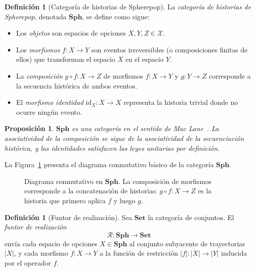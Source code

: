 \documentclass[12pt]{article}
\theoremstyle{plain}
\newtheorem{proposition}[theorem]{Proposición}
\theoremstyle{definition}
\newtheorem{definition}[theorem]{Definición}
\begin{document}
\begin{definition}[Categoría de historias de Spherepop]
\label{def:categoria}
La \emph{categoría de historias de Spherepop}, denotada $\mathbf{Sph}$, se define como sigue:
\begin{itemize}
\item[] Los \emph{objetos} son espacios de opciones $X, Y, Z \in \mathcal{X}$.
\item[] Los \emph{morfismos} $f: X \to Y$ son eventos irreversibles (o composiciones finitas de ellos) que transforman el espacio $X$ en el espacio $Y$.
\item[] La \emph{composición} $g \circ f: X \to Z$ de morfismos $f: X \to Y$ y $g: Y \to Z$ corresponde a la secuencia histórica de ambos eventos.
\item[] El \emph{morfismo identidad} $\mathrm{id}_X: X \to X$ representa la historia trivial donde no ocurre ningún evento.
\end{itemize}
\end{definition}

\begin{proposition}
\label{prop:categoria}
$\mathbf{Sph}$ es una categoría en el sentido de Mac Lane~\cite{maclane}. La asociatividad de la composición se sigue de la asociatividad de la secuenciación histórica, y las identidades satisfacen las leyes unitarias por definición.
\end{proposition}

La Figura~\ref{fig:diagrama_categoria} presenta el diagrama conmutativo básico de la categoría $\mathbf{Sph}$.

\begin{figure}[ht]
\centering
{}
\caption{Diagrama conmutativo en $\mathbf{Sph}$. La composición de morfismos corresponde a la concatenación de historias: $g \circ f: X \to Z$ es la historia que primero aplica $f$ y luego $g$.}
\label{fig:diagrama_categoria}
\end{figure}

\begin{definition}[Funtor de realización]
\label{def:funtor}
Sea $\mathbf{Set}$ la categoría de conjuntos. El \emph{funtor de realización}
\[
\mathcal{R}: \mathbf{Sph} \longrightarrow \mathbf{Set}
\]
envía cada espacio de opciones $X \in \mathbf{Sph}$ al conjunto subyacente de trayectorias $|X|$, y cada morfismo $f: X \to Y$ a la función de restricción $|f|: |X| \to |Y|$ inducida por el operador $f$.
\end{definition}
\end{document}
